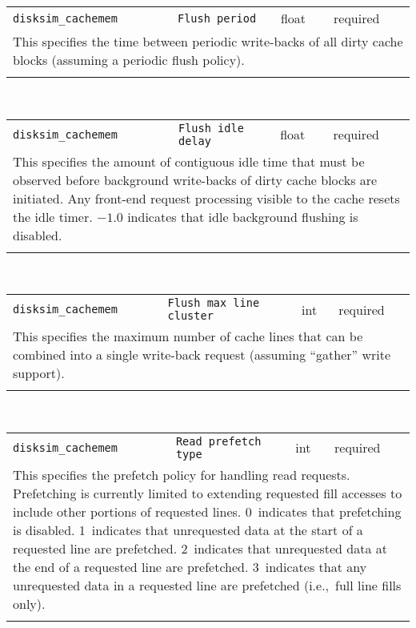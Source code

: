 \noindent 
\begin{tabular}{|p{\lpmodwidth}|p{\lpnamewidth}|p{0.5in}|p{0.5in}|}
\cline{1-4}
\texttt{disksim\_cachemem} & \texttt{Flush period} & float & required \\ 
\cline{1-4}
\multicolumn{4}{|p{6in}|}{
This specifies the time between periodic write-backs of all dirty cache
blocks (assuming a periodic flush policy).
}\\ 
\cline{1-4}
\multicolumn{4}{p{5in}}{}\\
\end{tabular}\\ 
\noindent 
\begin{tabular}{|p{\lpmodwidth}|p{\lpnamewidth}|p{0.5in}|p{0.5in}|}
\cline{1-4}
\texttt{disksim\_cachemem} & \texttt{Flush idle delay} & float & required \\ 
\cline{1-4}
\multicolumn{4}{|p{6in}|}{
This specifies the amount of contiguous idle time that must be observed
before background write-backs of dirty cache blocks are initiated.
Any front-end request processing visible to the cache resets the idle
timer. $-1.0$ indicates that idle background flushing is disabled.
}\\ 
\cline{1-4}
\multicolumn{4}{p{5in}}{}\\
\end{tabular}\\ 
\noindent 
\begin{tabular}{|p{\lpmodwidth}|p{\lpnamewidth}|p{0.5in}|p{0.5in}|}
\cline{1-4}
\texttt{disksim\_cachemem} & \texttt{Flush max line cluster} & int & required \\ 
\cline{1-4}
\multicolumn{4}{|p{6in}|}{
This specifies the maximum number of cache lines that can be combined into
a single write-back request (assuming ``gather'' write support).
}\\ 
\cline{1-4}
\multicolumn{4}{p{5in}}{}\\
\end{tabular}\\ 
\noindent 
\begin{tabular}{|p{\lpmodwidth}|p{\lpnamewidth}|p{0.5in}|p{0.5in}|}
\cline{1-4}
\texttt{disksim\_cachemem} & \texttt{Read prefetch type} & int & required \\ 
\cline{1-4}
\multicolumn{4}{|p{6in}|}{
This specifies the prefetch policy for handling read requests.
Prefetching is currently limited to extending requested fill accesses
to include other portions of requested lines.
0~indicates that prefetching is disabled.
1~indicates that unrequested data at the start of a requested line are
prefetched.
2~indicates that unrequested data at the end of a requested line are
prefetched.
3~indicates that any unrequested data in a requested line are
prefetched (i.e.,~full line fills only).
}\\ 
\cline{1-4}
\multicolumn{4}{p{5in}}{}\\
\end{tabular}\\ 
